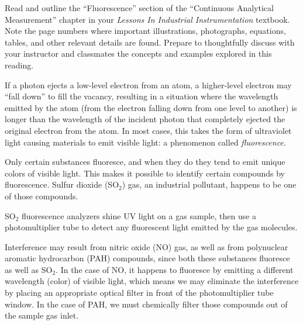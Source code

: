 
Read and outline the ``Fluorescence'' section of the ``Continuous Analytical Measurement'' chapter in your {\it Lessons In Industrial Instrumentation} textbook.  Note the page numbers where important illustrations, photographs, equations, tables, and other relevant details are found.  Prepare to thoughtfully discuss with your instructor and classmates the concepts and examples explored in this reading.













If a photon ejects a low-level electron from an atom, a higher-level electron may ``fall down'' to fill the vacancy, resulting in a situation where the wavelength emitted by the atom (from the electron falling down from one level to another) is longer than the wavelength of the incident photon that completely ejected the original electron from the atom.  In most cases, this takes the form of ultraviolet light causing materials to emit visible light: a phenomenon called {\it fluorescence}.

\vskip 10pt

Only certain substances fluoresce, and when they do they tend to emit unique colors of visible light.  This makes it possible to identify certain compounds by fluorescence.  Sulfur dioxide (SO$_{2}$) gas, an industrial pollutant, happens to be one of those compounds.

SO$_{2}$ fluorescence analyzers shine UV light on a gas sample, then use a photomultiplier tube to detect any fluorescent light emitted by the gas molecules.

\vskip 10pt

Interference may result from nitric oxide (NO) gas, as well as from polynuclear aromatic hydrocarbon (PAH) compounds, since both these substances fluoresce as well as SO$_{2}$.  In the case of NO, it happens to fluoresce by emitting a different wavelength (color) of visible light, which means we may eliminate the interference by placing an appropriate optical filter in front of the photomultiplier tube window.  In the case of PAH, we must chemically filter those compounds out of the sample gas inlet.










